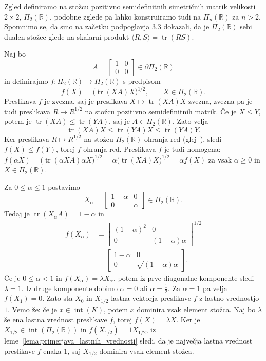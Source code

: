 \documentclass[mat2, tisk]{fmfdelo}
\newcommand{\R}{\mathbb{R}}
\begin{document}
\begin{zgled}\label{zgled:kontinuum_stozcnega_spektra}
Zgled definiramo na stožcu pozitivno semidefinitnih simetričnih matrik
velikosti $2\times2$, $\Pi_2(\R)$, podobne zglede pa lahko konstruiramo
tudi na $\Pi_n(\R)$ za $n>2$. Spomnimo se, da smo na začetku podpoglavja 3.3 dokazali, da je $\Pi_2(\R)$ sebi
dualen stožec glede na skalarni produkt
$\langle R,S\rangle=\operatorname{tr}(RS)$.

Naj bo
\[
A=
\begin{bmatrix}
1&0\\
0&0
\end{bmatrix}
\in\partial\Pi_2(\R)
\]
in definirajmo $f\colon\Pi_2(\R)\longrightarrow\Pi_2(\R)$ s predpisom
\[
f(X)=\bigl(\operatorname{tr}(XA)X\bigr)^{1/2},
\qquad X\in\Pi_2(\R).
\]
Preslikava $f$ je zvezna, saj je preslikava
$X\mapsto\operatorname{tr}(XA)X$ zvezna, zvezna pa je tudi
preslikava $R\mapsto R^{1/2}$ na stožcu pozitivno
semidefinitnih matrik.
Če je $X\leq Y$, potem je
$\operatorname{tr}(XA)\leq\operatorname{tr}(YA)$, saj je
$A\in\Pi_2(\R)$. Zato velja
\[
\operatorname{tr}(XA)X
\leq
\operatorname{tr}(YA)X
\leq
\operatorname{tr}(YA)Y.
\]
Ker preslikava $R\longmapsto R^{1/2}$ na stožcu $\Pi_2(\R)$
ohranja red (glej~\cite[razdelek~1.4]{LemNuss}),
sledi $f(X)\leq f(Y)$, torej $f$ ohranja red. Preslikava $f$ je tudi homogena: 
$f(\alpha X)=\bigl(\operatorname{tr}(\alpha XA)\alpha X\bigr)^{1/2}
=\alpha\bigl(\operatorname{tr}(XA)X\bigr)^{1/2}=\alpha f(X)$ za vsak $\alpha\geq0$ in $X\in\Pi_2(\R)$.

Za $0\leq\alpha\leq1$ postavimo
\[
X_\alpha
=
\begin{bmatrix}
1-\alpha&0\\
0&\alpha
\end{bmatrix}
\in\Pi_2(\R).
\]
Tedaj je $\operatorname{tr}(X_\alpha A)=1-\alpha$ in
\[
\begin{aligned}
f(X_\alpha)
&=
\begin{bmatrix}
(1-\alpha)^2&0\\
0&(1-\alpha)\alpha
\end{bmatrix}^{1/2}\\
&=
\begin{bmatrix}
1-\alpha&0\\
0&\sqrt{(1-\alpha)\alpha}
\end{bmatrix}.
\end{aligned}
\]
Če je $0\leq\alpha<1$ in $f(X_\alpha)=\lambda X_\alpha$, potem iz prve diagonalne komponente 
sledi $\lambda=1$. Iz druge komponente dobimo $\alpha=0$ ali $\alpha=\frac12$. Za $\alpha=1$ 
pa velja $f(X_1)=0$. Zato sta $X_0$ in $X_{1/2}$ lastna vektorja
preslikave $f$ z lastno vrednostjo $1$. 
Vemo že: če je $x \in \operatorname{int}(K)$, potem $x$ dominira vsak element stožca. 
Naj bo $\lambda$ še ena lastna vrednost preslikave $f$, torej $f(X) = \lambda X$. Ker je
$X_{1/2}\in\operatorname{int}(\Pi_2(\R))$ in $f(X_{1/2}) = 1 X_{1/2}$, iz
leme~\ref{lema:primerjava_lastnih_vrednosti} sledi, da je največja lastna
vrednost preslikave $f$ enaka $1$, saj $X_{1/2}$ dominira vsak element stožca.


\end{zgled}
\end{document}
